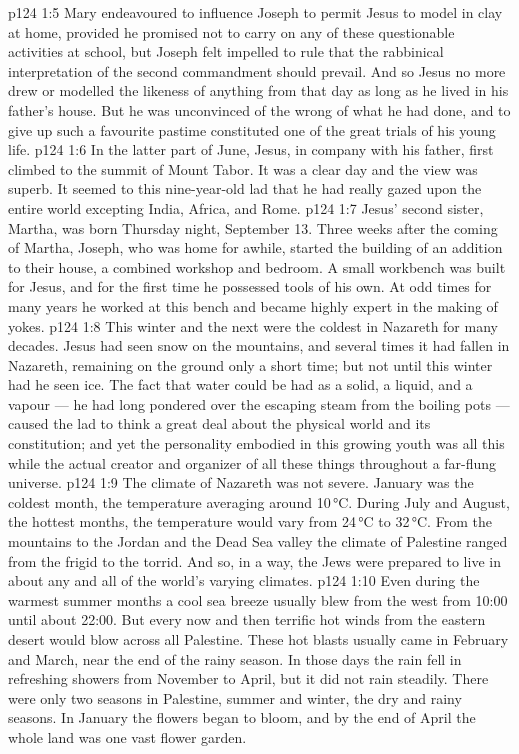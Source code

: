 \vs p124 1:5 Mary endeavoured to influence Joseph to permit Jesus to model in clay at home, provided he promised not to carry on any of these questionable activities at school, but Joseph felt impelled to rule that the rabbinical interpretation of the second commandment should prevail. And so Jesus no more drew or modelled the likeness of anything from that day as long as he lived in his father’s house. But he was unconvinced of the wrong of what he had done, and to give up such a favourite pastime constituted one of the great trials of his young life.
\vs p124 1:6 \pc In the latter part of June, Jesus, in company with his father, first climbed to the summit of Mount Tabor. It was a clear day and the view was superb. It seemed to this nine\hyp{}year\hyp{}old lad that he had really gazed upon the entire world excepting India, Africa, and Rome.
\vs p124 1:7 \pc Jesus’ second sister, Martha, was born Thursday night, September 13. Three weeks after the coming of Martha, Joseph, who was home for awhile, started the building of an addition to their house, a combined workshop and bedroom. A small workbench was built for Jesus, and for the first time he possessed tools of his own. At odd times for many years he worked at this bench and became highly expert in the making of yokes.
\vs p124 1:8 \pc This winter and the next were the coldest in Nazareth for many decades. Jesus had seen snow on the mountains, and several times it had fallen in Nazareth, remaining on the ground only a short time; but not until this winter had he seen ice. The fact that water could be had as a solid, a liquid, and a vapour --- he had long pondered over the escaping steam from the boiling pots --- caused the lad to think a great deal about the physical world and its constitution; and yet the personality embodied in this growing youth was all this while the actual creator and organizer of all these things throughout a far\hyp{}flung universe.
\vs p124 1:9 The climate of Nazareth was not severe. January was the coldest month, the temperature averaging around 10\,°C. During July and August, the hottest months, the temperature would vary from 24\,°C to 32\,°C. From the mountains to the Jordan and the Dead Sea valley the climate of Palestine ranged from the frigid to the torrid. And so, in a way, the Jews were prepared to live in about any and all of the world’s varying climates.
\vs p124 1:10 Even during the warmest summer months a cool sea breeze usually blew from the west from 10:00 until about 22:00. But every now and then terrific hot winds from the eastern desert would blow across all Palestine. These hot blasts usually came in February and March, near the end of the rainy season. In those days the rain fell in refreshing showers from November to April, but it did not rain steadily. There were only two seasons in Palestine, summer and winter, the dry and rainy seasons. In January the flowers began to bloom, and by the end of April the whole land was one vast flower garden.
